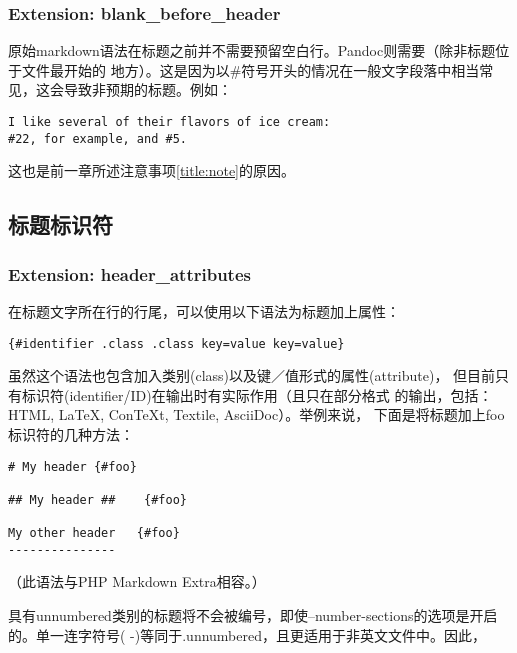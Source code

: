 \documentclass[cn]{elegantbook}
\begin{document}
\hypertarget{extension-blank_before_header}{%
\subsubsection{Extension:
blank\_before\_header}\label{extension-blank_before_header}}

原始markdown语法在标题之前并不需要预留空白行。Pandoc则需要（除非标题位于文件最开始的
地方）。这是因为以\#符号开头的情况在一般文字段落中相当常见，这会导致非预期的标题。例如：

\begin{lstlisting}
I like several of their flavors of ice cream:
#22, for example, and #5.
\end{lstlisting}

这也是前一章所述注意事项\ref{title:note}的原因。

\hypertarget{ux6807ux9898ux6807ux8bc6ux7b26}{%
\subsection{标题标识符}\label{ux6807ux9898ux6807ux8bc6ux7b26}}

\hypertarget{extension-header_attributes}{%
\subsubsection{Extension:
header\_attributes}\label{extension-header_attributes}}

在标题文字所在行的行尾，可以使用以下语法为标题加上属性：

\begin{lstlisting}
{#identifier .class .class key=value key=value}
\end{lstlisting}

虽然这个语法也包含加入类别(class)以及键／值形式的属性(attribute)，
但目前只有标识符(identifier/ID)在输出时有实际作用（且只在部分格式
的输出，包括：HTML, LaTeX, ConTeXt, Textile, AsciiDoc）。举例来说，
下面是将标题加上foo标识符的几种方法：

\begin{lstlisting}
# My header {#foo}

## My header ##    {#foo}

My other header   {#foo}
---------------
\end{lstlisting}

（此语法与PHP Markdown Extra相容。）

具有unnumbered类别的标题将不会被编号，即使--number-sections的选项是开启
的。单一连字符号( -)等同于.unnumbered，且更适用于非英文文件中。因此，
\end{document}
